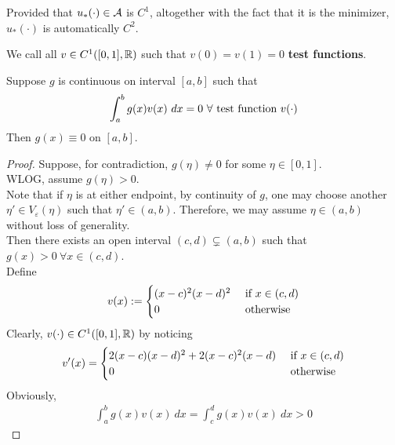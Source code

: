 \documentclass{article}
\begin{document}
	\begin{lemma}
		Provided that $u_*(\cdot) \in \mathcal{{A}}$ is $C^1$, altogether with the fact that it is the minimizer, $u_*(\cdot)$ is automatically $C^2$.
	\end{lemma}
	
	\begin{notation}
		We call all $v \in C^1([0, 1], \mathbb{R})$ such that $v(0) = v(1) = 0$ \textbf{test functions}.
	\end{notation}
	
	\begin{lemma}
		Suppose $g$ is continuous on interval $[a, b]$ such that
		\begin{align}
			\int_a^b g(x) v(x)\ dx = 0\ \forall \text{{ test function }} v(\cdot)
		\end{align}
		Then $g(x) \equiv 0$ on $[a, b]$.
	\end{lemma}
	
	\begin{proof}
		Suppose, for contradiction, $g(\eta) \neq 0$ for some $\eta \in [0, 1]$. \\
		WLOG, assume $g(\eta) > 0$. \\
		Note that if $\eta$ is at either endpoint, by continuity of $g$, one may choose another $\eta' \in V_\varepsilon(\eta)$ such that $\eta' \in (a, b)$. Therefore, we may assume $\eta \in (a, b)$ without loss of generality. \\
		Then there exists an open interval $(c, d) \subsetneq (a, b)$ such that $g(x) > 0\ \forall x \in (c, d)$. \\
		Define
		\begin{align}
			v(x) := \begin{cases}
				(x-c)^2 (x-d)^2 &\text{{ if }} x \in (c, d) \\
				0 &\text{{ otherwise}}
			\end{cases}
		\end{align}
		Clearly, $v(\cdot) \in C^1([0, 1], \mathbb{R})$ by noticing
		\begin{align}
			v'(x) = \begin{cases}
				2(x-c)(x-d)^2 + 2 (x-c)^2(x-d) &\text{{ if }} x \in (c, d) \\
				0 &\text{{ otherwise}}
			\end{cases}
		\end{align}
		Obviously,
		\begin{align}
			\int_a^b g(x) v(x)\ dx = \int_c^d g(x) v(x)\ dx > 0
		\end{align}
	\end{proof}
	
\end{document}
